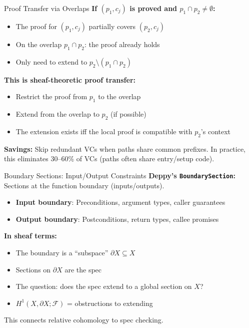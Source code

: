 \documentclass[aspectratio=169,10pt]{beamer}
\newcommand{\Fscr}{\mathcal{F}}
\begin{document}
\begin{frame}{Proof Transfer via Overlaps}
\textbf{If $(p_1, c_j)$ is proved and $p_1 \cap p_2 \neq \emptyset$:}
\begin{itemize}
  \item The proof for $(p_1, c_j)$ partially covers $(p_2, c_j)$
  \item On the overlap $p_1 \cap p_2$: the proof already holds
  \item Only need to extend to $p_2 \setminus (p_1 \cap p_2)$
\end{itemize}

\textbf{This is sheaf-theoretic proof transfer:}
\begin{itemize}
  \item Restrict the proof from $p_1$ to the overlap
  \item Extend from the overlap to $p_2$ (if possible)
  \item The extension exists iff the local proof is compatible with $p_2$'s context
\end{itemize}

\textbf{Savings:} Skip redundant VCs when paths share common prefixes. In practice, this eliminates 30--60\% of VCs (paths often share entry/setup code).
\end{frame}

\begin{frame}{Boundary Sections: Input/Output Constraints}
\textbf{Deppy's \texttt{BoundarySection}:} Sections at the function boundary (inputs/outputs).

\begin{itemize}
  \item \textbf{Input boundary}: Preconditions, argument types, caller guarantees
  \item \textbf{Output boundary}: Postconditions, return types, callee promises
\end{itemize}

\textbf{In sheaf terms:}
\begin{itemize}
  \item The boundary is a ``subspace'' $\partial X \subseteq X$
  \item Sections on $\partial X$ are the spec
  \item The question: does the spec extend to a global section on $X$?
  \item $H^1(X, \partial X; \Fscr)$ = obstructions to extending
\end{itemize}

This connects relative cohomology to spec checking.
\end{frame}
\end{document}
